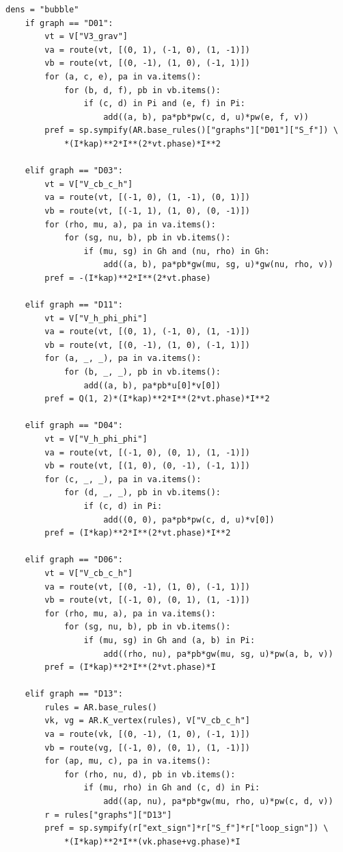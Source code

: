 \documentclass[11pt,a4paper]{article}
\theoremstyle{plain}
\theoremstyle{definition}
\theoremstyle{remark}
\numberwithin{equation}{section}
\begin{document}
\begin{lstlisting}[caption={Consolidated exact checker and coverage-aware optional replay.},
                  label={lst:program}]
    dens = "bubble"
    if graph == "D01":
        vt = V["V3_grav"]
        va = route(vt, [(0, 1), (-1, 0), (1, -1)])
        vb = route(vt, [(0, -1), (1, 0), (-1, 1)])
        for (a, c, e), pa in va.items():
            for (b, d, f), pb in vb.items():
                if (c, d) in Pi and (e, f) in Pi:
                    add((a, b), pa*pb*pw(c, d, u)*pw(e, f, v))
        pref = sp.sympify(AR.base_rules()["graphs"]["D01"]["S_f"]) \
            *(I*kap)**2*I**(2*vt.phase)*I**2

    elif graph == "D03":
        vt = V["V_cb_c_h"]
        va = route(vt, [(-1, 0), (1, -1), (0, 1)])
        vb = route(vt, [(-1, 1), (1, 0), (0, -1)])
        for (rho, mu, a), pa in va.items():
            for (sg, nu, b), pb in vb.items():
                if (mu, sg) in Gh and (nu, rho) in Gh:
                    add((a, b), pa*pb*gw(mu, sg, u)*gw(nu, rho, v))
        pref = -(I*kap)**2*I**(2*vt.phase)

    elif graph == "D11":
        vt = V["V_h_phi_phi"]
        va = route(vt, [(0, 1), (-1, 0), (1, -1)])
        vb = route(vt, [(0, -1), (1, 0), (-1, 1)])
        for (a, _, _), pa in va.items():
            for (b, _, _), pb in vb.items():
                add((a, b), pa*pb*u[0]*v[0])
        pref = Q(1, 2)*(I*kap)**2*I**(2*vt.phase)*I**2

    elif graph == "D04":
        vt = V["V_h_phi_phi"]
        va = route(vt, [(-1, 0), (0, 1), (1, -1)])
        vb = route(vt, [(1, 0), (0, -1), (-1, 1)])
        for (c, _, _), pa in va.items():
            for (d, _, _), pb in vb.items():
                if (c, d) in Pi:
                    add((0, 0), pa*pb*pw(c, d, u)*v[0])
        pref = (I*kap)**2*I**(2*vt.phase)*I**2

    elif graph == "D06":
        vt = V["V_cb_c_h"]
        va = route(vt, [(0, -1), (1, 0), (-1, 1)])
        vb = route(vt, [(-1, 0), (0, 1), (1, -1)])
        for (rho, mu, a), pa in va.items():
            for (sg, nu, b), pb in vb.items():
                if (mu, sg) in Gh and (a, b) in Pi:
                    add((rho, nu), pa*pb*gw(mu, sg, u)*pw(a, b, v))
        pref = (I*kap)**2*I**(2*vt.phase)*I

    elif graph == "D13":
        rules = AR.base_rules()
        vk, vg = AR.K_vertex(rules), V["V_cb_c_h"]
        va = route(vk, [(0, -1), (1, 0), (-1, 1)])
        vb = route(vg, [(-1, 0), (0, 1), (1, -1)])
        for (ap, mu, c), pa in va.items():
            for (rho, nu, d), pb in vb.items():
                if (mu, rho) in Gh and (c, d) in Pi:
                    add((ap, nu), pa*pb*gw(mu, rho, u)*pw(c, d, v))
        r = rules["graphs"]["D13"]
        pref = sp.sympify(r["ext_sign"]*r["S_f"]*r["loop_sign"]) \
            *(I*kap)**2*I**(vk.phase+vg.phase)*I


\end{lstlisting}
\end{document}

